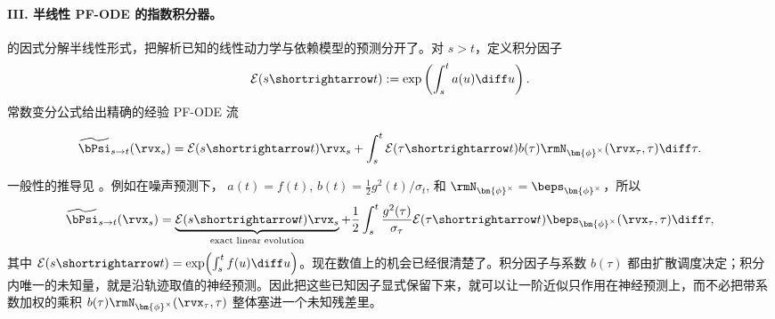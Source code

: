 \paragraph{III. 半线性 PF-ODE 的指数积分器。}
 的因式分解半线性形式，把解析已知的线性动力学与依赖模型的预测分开了。对 $s>t$，定义积分因子
\[
\mathcal{E}(s\shortrightarrow t)
:=
\exp\left(
\int_s^t a(u)\diff u
\right).
\]
常数变分公式给出精确的经验 PF-ODE 流
\begin{mdframed}
\begin{equation}
\label{eq:factored-variation-of-constants}
\widetilde\bPsi_{s\to t}(\rvx_s)
=
\mathcal{E}(s\shortrightarrow t)\rvx_s
+
\int_s^t
\mathcal{E}(\tau\shortrightarrow t)
b(\tau)
\rmN_{\bm{\phi}^\times}(\rvx_\tau,\tau)
\diff\tau .
\end{equation}
\end{mdframed}
一般性的推导见 。例如在噪声预测下，
$a(t)=f(t)$,
$b(t)=\tfrac{1}{2}g^2(t)/\sigma_t$, 和
$\rmN_{\bm{\phi}^\times}=\beps_{\bm{\phi}^\times}$，所以
\begin{equation}
\label{eq:variation_of_constants}
\widetilde\bPsi_{s\to t}(\rvx_s)
=
\underbrace{
\mathcal{E}(s\shortrightarrow t)\rvx_s
}_{\text{exact linear evolution}}
+
\frac{1}{2}
\int_s^t
\frac{g^2(\tau)}{\sigma_\tau}
\mathcal{E}(\tau\shortrightarrow t)
\beps_{\bm{\phi}^\times}(\rvx_\tau,\tau)
\diff\tau,
\end{equation}
其中
$\mathcal{E}(s\shortrightarrow t)
=
\exp\!\left(\int_s^t f(u)\diff u\right)$。现在数值上的机会已经很清楚了。积分因子与系数 $b(\tau)$ 都由扩散调度决定；积分内唯一的未知量，就是沿轨迹取值的神经预测。因此把这些已知因子显式保留下来，就可以让一阶近似只作用在神经预测上，而不必把带系数加权的乘积 $b(\tau)\rmN_{\bm{\phi}^\times}(\rvx_\tau,\tau)$ 整体塞进一个未知残差里。


